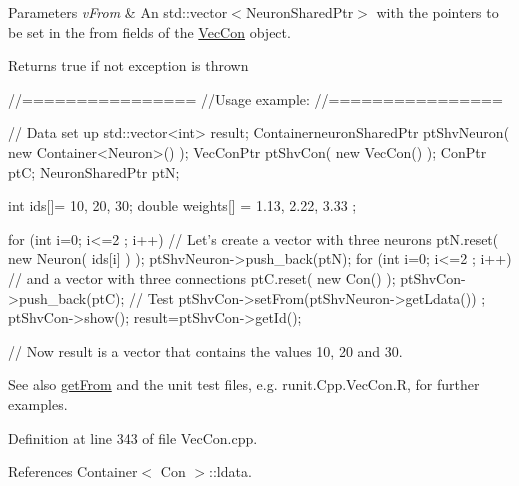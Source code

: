 \begin{DoxyParams}{Parameters}
{\em vFrom} & An std::vector$<$NeuronSharedPtr$>$ with the pointers to be set in the from fields of the \hyperlink{classvec_con}{VecCon} object.\\
\hline
\end{DoxyParams}
\begin{DoxyReturn}{Returns}
true if not exception is thrown
\end{DoxyReturn}

\begin{DoxyCode}
        //================
        //Usage example:
        //================

        // Data set up
                std::vector<int> result;
                ContainerneuronSharedPtr ptShvNeuron( new Container<Neuron>() );
                VecConPtr ptShvCon( new VecCon() );
                ConPtr    ptC;
                NeuronSharedPtr ptN;

                int ids[]= {10, 20, 30};
                double weights[] = {1.13, 2.22, 3.33 };

                for (int i=0; i<=2 ; i++) {                             // Let's 
      create a vector with three neurons
                        ptN.reset( new Neuron( ids[i] ) );
                        ptShvNeuron->push_back(ptN);
                }
                for (int i=0; i<=2 ; i++) {                             // and a 
      vector with three connections
                        ptC.reset( new Con() );
                        ptShvCon->push_back(ptC);
                }
        // Test
                ptShvCon->setFrom(ptShvNeuron->getLdata()) ;
                ptShvCon->show();
                result=ptShvCon->getId();

        // Now result is a vector that contains the values 10, 20 and 30.
\end{DoxyCode}


\begin{DoxySeeAlso}{See also}
\hyperlink{classvec_con_ae72d00aedcd054e690f1dcf2ca5ac2c2}{getFrom} and the unit test files, e.g. runit.Cpp.VecCon.R, for further examples. 
\end{DoxySeeAlso}


Definition at line 343 of file VecCon.cpp.



References Container$<$ Con $>$::ldata.


